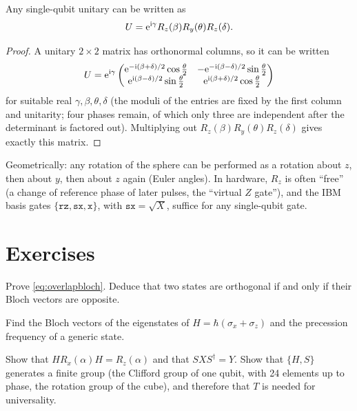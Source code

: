 \begin{theorem}\label{thm:euler}
Any single-qubit unitary can be written as
\begin{equation*}U=\mathrm e^{\mathrm i\gamma}R_z(\beta)R_y(\theta)R_z(\delta).\end{equation*}
\end{theorem}
\begin{proof}
A unitary $2\times2$ matrix has orthonormal columns, so it can be written
\begin{equation*}
U=\mathrm e^{\mathrm i\gamma}\begin{pmatrix}\mathrm e^{-\mathrm i(\beta+\delta)/2}\cos\frac\theta2&-\mathrm e^{-\mathrm i(\beta-\delta)/2}\sin\frac\theta2\\
\mathrm e^{\mathrm i(\beta-\delta)/2}\sin\frac\theta2&\mathrm e^{\mathrm i(\beta+\delta)/2}\cos\frac\theta2\end{pmatrix}
\end{equation*}
for suitable real
$\gamma,\beta,\theta,\delta$ (the moduli of the entries are fixed by the first column and unitarity; four phases remain, of which only three
are independent after the determinant is factored out). Multiplying out $R_z(\beta)R_y(\theta)R_z(\delta)$ gives exactly this matrix.
\end{proof}
Geometrically: any rotation of the sphere can be performed as a rotation about $z$, then about $y$, then about $z$ again (Euler angles).
In hardware, $R_z$ is often ``free'' (a change of reference phase of later pulses, the ``virtual $Z$ gate''), and the IBM basis gates
$\{\texttt{rz},\texttt{sx},\texttt{x}\}$, with $\texttt{sx}=\sqrt X$, suffice for any single-qubit gate.

\section{Exercises}
\begin{exercise}
Prove \cref{eq:overlapbloch}. Deduce that two states are orthogonal if and only if their Bloch vectors are opposite.
\end{exercise}
\begin{exercise}
Find the Bloch vectors of the eigenstates of $H=\hbar(\sigma_x+\sigma_z)$ and the precession frequency of a generic state.
\end{exercise}
\begin{exercise}
Show that $HR_x(\alpha)H=R_z(\alpha)$ and that $SXS^\dagger=Y$. Show that $\{H,S\}$ generates a finite group (the Clifford group of one qubit,
with 24 elements up to phase, the rotation group of the cube), and therefore that $T$ is needed for universality.
\end{exercise}
